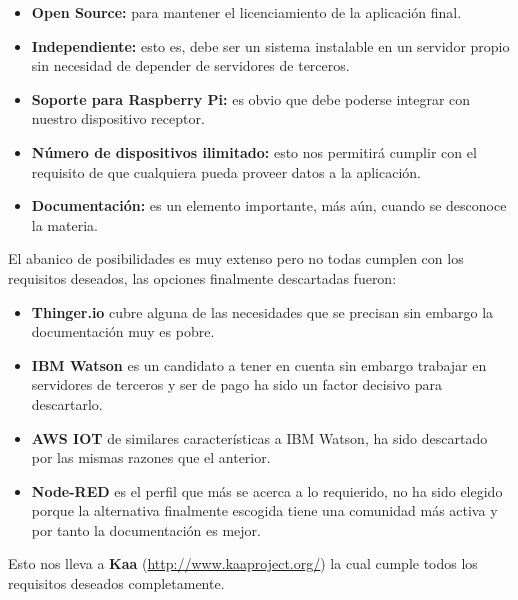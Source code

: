 \begin{itemize}
    \item \textbf{Open Source: } para mantener el licenciamiento de la aplicación final.
    \item \textbf{Independiente: } esto es, debe ser un sistema instalable en un servidor propio sin necesidad de depender de servidores de terceros.
    \item \textbf{Soporte para Raspberry Pi: } es obvio que debe poderse integrar con nuestro dispositivo receptor.
    \item \textbf{Número de dispositivos ilimitado: } esto nos permitirá cumplir con el requisito de que cualquiera pueda proveer datos a la aplicación.
    \item \textbf{Documentación: } es un elemento importante, más aún, cuando se desconoce la materia.
\end{itemize}

El abanico de posibilidades es muy extenso pero no todas cumplen con los requisitos deseados, las opciones finalmente descartadas fueron:
\begin{itemize}
    \item \textbf{Thinger.io} cubre alguna de las necesidades que se precisan sin embargo la documentación muy es pobre.
    \item \textbf{IBM Watson} es un candidato a tener en cuenta sin embargo trabajar en servidores de terceros y ser de pago ha sido un factor decisivo para descartarlo.
    \item \textbf{AWS IOT} de similares características a IBM Watson, ha sido descartado por las mismas razones que el anterior.
    \item \textbf{Node-RED} es el perfil que más se acerca a lo requierido, no ha sido elegido porque la alternativa finalmente escogida tiene una comunidad más activa y por tanto la documentación es mejor.
\end{itemize}

\bigskip

\newpage

Esto nos lleva a \textbf{Kaa} (\url{http://www.kaaproject.org/}) la cual cumple todos los requisitos deseados completamente.

